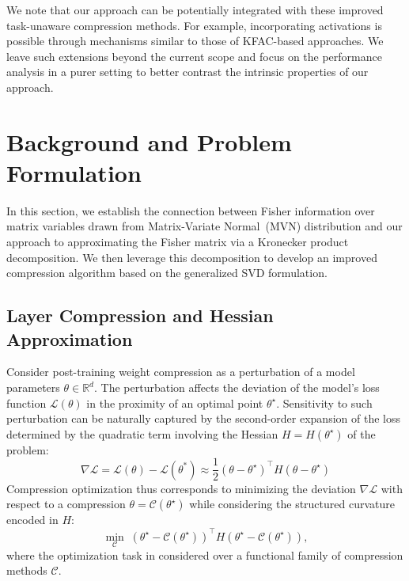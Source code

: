 \documentclass{article}
\begin{document}
We note that our approach can be potentially integrated with these improved task-unaware compression methods. For example, incorporating activations is possible through mechanisms similar to those of KFAC-based approaches. We leave such extensions beyond the current scope and focus on the performance analysis in a purer setting to better contrast the intrinsic properties of our approach.



\section{Background and Problem Formulation}
\label{sec:theory}
In this section, we establish the connection between Fisher information over matrix variables drawn from Matrix-Variate Normal~(MVN) distribution and our approach to approximating the Fisher matrix via a Kronecker product decomposition. We then leverage this decomposition to develop an improved compression algorithm based on the generalized SVD formulation.

\subsection{Layer Compression and Hessian Approximation}
\label{sec:layer_comp_theory}
Consider post-training weight compression as a perturbation of a model parameters $\theta\in\mathbb{R}^d$. The perturbation affects the deviation of the model's loss function $\mathcal{L}(\theta)$ in the proximity of an optimal point $\theta^\star$. Sensitivity to such perturbation can be naturally captured by the second-order expansion of the loss determined by the quadratic term involving the Hessian $H=H\left(\theta^\star\right)$ of the problem:
\begin{equation}\label{eq:loss_dev}
\nabla{\mathcal L}=\mathcal{L}(\theta) -\mathcal{L}\left(\theta^*\right) \approx \frac{1}{2}\left(\theta-\theta^\star\right)^{\top} H \left(\theta-\theta^\star\right)    
\end{equation}
Compression optimization thus corresponds to minimizing the deviation $\nabla{\mathcal L}$ with respect to a compression $\theta=\mathcal{C}(\theta^\star)$ while considering the structured curvature encoded in $H$:
\begin{equation}\label{eq:compression_opt}
    \underset{\mathcal{C}}{\min}\;\left(\theta^\star - \mathcal{C}\left(\theta^\star\right)\right)^\top H \left(\theta^\star - \mathcal{C}\left(\theta^\star\right)\right),
\end{equation}
where the optimization task in considered over a functional family of compression methods $\mathcal{C}$. 
\end{document}
